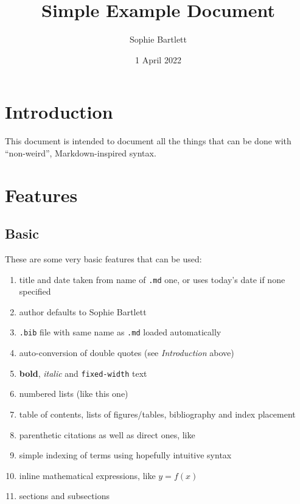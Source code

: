 \documentclass[11pt,a4paper]{article}
\title{Simple Example Document}
\author{Sophie Bartlett}
\date{1 April 2022}
\begin{document}
\maketitle

\tableofcontents


\section{Introduction}

This document is intended to document all the things that can be done with
``non-weird'', Markdown-inspired syntax.

\section{Features}

\subsection{Basic}

These are some very basic features that can be used:
\begin{enumerate}
\item 
title and date taken from name of \verb|.md| one, or uses today's date if none specified

\item 
author defaults to Sophie Bartlett

\item 
\verb|.bib| file with same name as \verb|.md| loaded automatically

\item 
auto-conversion of double quotes (see \textit{Introduction} above)

\item 
\textbf{bold}, \textit{italic} and \verb|fixed-width| text

\item 
numbered lists (like this one)

\item 
table of contents, lists of figures/tables, bibliography and index placement

\item 
parenthetic citations \parencite{Jones2000} as well as direct ones, like \textcite{Smith2001}

\item 
simple indexing of terms using hopefully intuitive syntax

\item 
inline mathematical expressions, like $y = f(x)$

\item 
sections and subsections

\end{enumerate}
\end{document}
